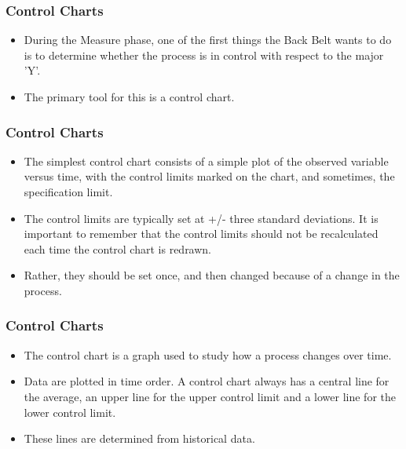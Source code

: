 \documentclass{beamer}
\begin{document}
	
%	
\begin{frame}
\frametitle{Control Charts}
\begin{itemize}
\item During the Measure phase, one of the first things the Back Belt wants to do is to determine whether the
process is in control with respect to the major 'Y'. 
\item The primary tool for this is a control chart. 
\end{itemize}
 
\end{frame}
\begin{frame}
	\frametitle{Control Charts}
	\begin{itemize}
		\item
The simplest control chart consists of a simple plot of the observed variable versus time, with the control
limits marked on the chart, and sometimes, the specification limit.

\item The control limits are typically set at +/- three standard deviations. It is important to remember that the
control limits should not be recalculated each time the control chart is redrawn. 
\item Rather, they should be set
once, and then changed because of a change in the process.
\end{itemize} 
\end{frame}
\begin{frame}
\frametitle{Control Charts}
\begin{itemize}
\item The control chart is a graph used to study how a process changes over time. 
\item Data are plotted in time order. A control chart always has a central line for the average, an upper line for the upper control limit and a lower line for the lower control limit.
\item These lines are determined from historical data.
\end{itemize} 
\end{frame}
\end{document}
